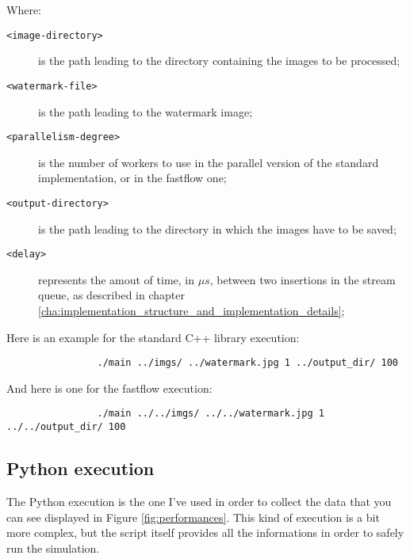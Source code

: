             Where:
            \begin{description}
                \item[\texttt{<image-directory>}] is the path leading to the directory containing the images to
                be processed;
                \item[\texttt{<watermark-file>}] is the path leading to the watermark image;
                \item[\texttt{<parallelism-degree>}] is the number of workers to use in the parallel version of
                the standard implementation, or in the fastflow one;
                \item[\texttt{<output-directory>}] is the path leading to the directory in which the images
                have to be saved;
                \item[\texttt{<delay>}] represents the amout of time, in $\mu s$, between two insertions in the
                stream queue, as described in chapter
                \ref{cha:implementation_structure_and_implementation_details};
            \end{description}
            Here is an example for the standard C++ library execution:

            \begin{verbatim}
                ./main ../imgs/ ../watermark.jpg 1 ../output_dir/ 100
            \end{verbatim}

            And here is one for the fastflow execution:

            \begin{verbatim}
                ./main ../../imgs/ ../../watermark.jpg 1 ../../output_dir/ 100
            \end{verbatim}
        \subsection{Python execution} %
        \label{sub:python_execution}
            The Python execution is the one I've used in order to collect the data that you can see displayed in
            Figure \ref{fig:performances}. This kind of execution is a bit more complex, but the script itself
            provides all the informations in order to safely run the simulation.

